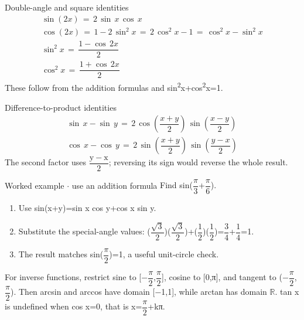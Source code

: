 \documentclass[11pt]{article}
\begin{document}
\begin{keepsection}
\begin{keepsection}
\begin{equationcard}{Double-angle and square identities}
\[ \begin{gathered} \sin (2{x})\, =\, 2\, \sin \, {x}\, \cos \, {x} \\ \cos (2{x})\, =\, 1-2\, \sin ^{2}{x}\, =\, 2\, \cos ^{2}{x}-1\, =\, \cos ^{2}{x}-\sin ^{2}{x} \\ \sin ^{2}{x}\, =\, \dfrac{1-\cos \, 2{x}}{2} \\ \cos ^{2}{x}\, =\, \dfrac{1+\cos \, 2{x}}{2} \end{gathered} \]
{\small These follow from the addition formulas and sin\textsuperscript{2}x+cos\textsuperscript{2}x=1.}
\end{equationcard}

\begin{equationcard}{Difference-to-product identities}
\[ \begin{gathered} \sin \, {x}-\sin \, {y}\, =\, 2\, \cos \left(\dfrac{{x}+{y}}{2}\right)\, \sin \left(\dfrac{{x}-{y}}{2}\right) \\ \cos \, {x}-\cos \, {y}\, =\, 2\, \sin \left(\dfrac{{x}+{y}}{2}\right)\, \sin \left(\dfrac{{y}-{x}}{2}\right) \end{gathered} \]
{\small The second factor uses {\small\ensuremath{\dfrac{\mathrm{y}-\mathrm{x}}{2}}}; reversing its sign would reverse the whole result.}
\end{equationcard}

\begin{workedbox}{Worked example \ensuremath{\cdot} use an addition formula}
Find sin({\small\ensuremath{\dfrac{π}{3}}}+{\small\ensuremath{\dfrac{π}{6}}}).

\begin{enumerate}
\item Use sin(x+y)=sin x cos y+cos x sin y.
\item Substitute the special-angle values: ({\small\ensuremath{\dfrac{\sqrt{3}}{2}}})({\small\ensuremath{\dfrac{\sqrt{3}}{2}}})+({\small\ensuremath{\dfrac{1}{2}}})({\small\ensuremath{\dfrac{1}{2}}})={\small\ensuremath{\dfrac{3}{4}}}+{\small\ensuremath{\dfrac{1}{4}}}=1.
\item The result matches sin({\small\ensuremath{\dfrac{π}{2}}})=1, a useful unit-circle check.
\end{enumerate}
\end{workedbox}

For inverse functions, restrict sine to [\ensuremath{-}{\small\ensuremath{\dfrac{π}{2}}},{\small\ensuremath{\dfrac{π}{2}}}], cosine to [0,π], and tangent to (\ensuremath{-}{\small\ensuremath{\dfrac{π}{2}}},{\small\ensuremath{\dfrac{π}{2}}}). Then arcsin and arccos have domain [\ensuremath{-}1,1], while arctan has domain \ensuremath{\mathbb{R}}. tan x is undefined when cos x=0, that is x={\small\ensuremath{\dfrac{π}{2}}}+kπ.


\end{keepsection}
\end{keepsection}
\end{document}
